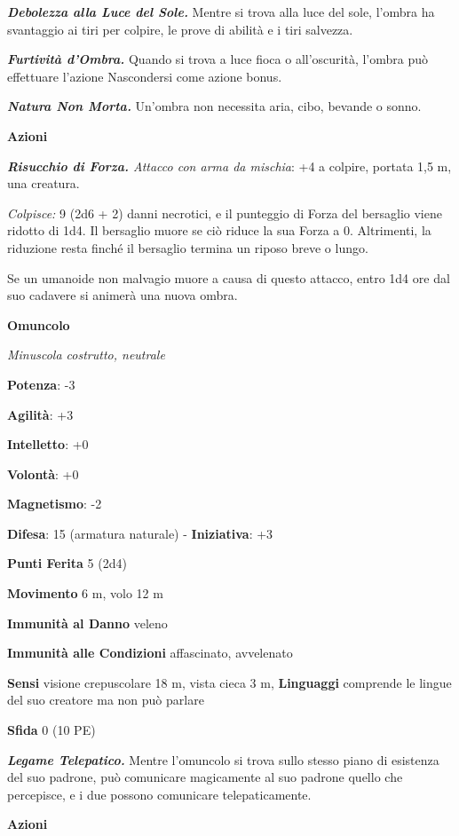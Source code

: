 \begin{multicols}{2}
\emph{\textbf{Debolezza alla Luce del Sole.}} Mentre si trova alla luce
del sole, l'ombra ha svantaggio ai tiri per colpire, le prove di abilità
e i tiri salvezza.

\emph{\textbf{Furtività d'Ombra.}} Quando si trova a luce fioca o
all'oscurità, l'ombra può effettuare l'azione Nascondersi come azione
bonus.

\emph{\textbf{Natura Non Morta.}} Un'ombra non necessita aria, cibo,
bevande o sonno.

\textbf{Azioni}

\emph{\textbf{Risucchio di Forza.} Attacco con arma da mischia}: +4 a
colpire, portata 1,5 m, una creatura.

\emph{Colpisce:} 9 (2d6 + 2) danni necrotici, e il punteggio di Forza
del bersaglio viene ridotto di 1d4. Il bersaglio muore se ciò riduce la
sua Forza a 0. Altrimenti, la riduzione resta finché il bersaglio
termina un riposo breve o lungo.

Se un umanoide non malvagio muore a causa di questo attacco, entro 1d4
ore dal suo cadavere si animerà una nuova ombra.

\textbf{Omuncolo}

\emph{Minuscola costrutto, neutrale}

\textbf{Potenza}: -3

\textbf{Agilità}: +3

\textbf{Intelletto}: +0

\textbf{Volontà}: +0

\textbf{Magnetismo}: -2

\textbf{Difesa}: 15 (armatura naturale) - \textbf{Iniziativa}: +3

\textbf{Punti Ferita} 5 (2d4)

\textbf{Movimento} 6 m, volo 12 m

\textbf{Immunità al Danno} veleno

\textbf{Immunità alle Condizioni} affascinato, avvelenato

\textbf{Sensi} visione crepuscolare 18 m, vista cieca 3 m, 
\textbf{Linguaggi} comprende le lingue del suo creatore ma non può
parlare

\textbf{Sfida} 0 (10 PE)

\emph{\textbf{Legame Telepatico.}} Mentre l'omuncolo si trova sullo
stesso piano di esistenza del suo padrone, può comunicare magicamente al
suo padrone quello che percepisce, e i due possono comunicare
telepaticamente.

\textbf{Azioni}


\end{multicols}
